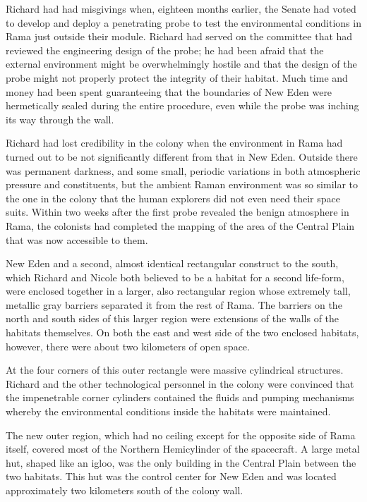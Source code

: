 \documentclass[]{article}
\begin{document}
{Richard had had misgivings when, eighteen months earlier, the Senate had voted to develop and deploy a penetrating probe to test the environmental conditions in Rama just outside their module.  Richard had served on the committee that had reviewed the engineering design of the probe; he had been afraid that the external environment might be overwhelmingly hostile and that the design of the probe might not properly protect the integrity of their habitat.  Much time and money had been spent guaranteeing that the boundaries of New Eden were hermetically sealed during the entire procedure, even while the probe was inching its way through the wall.

Richard had lost credibility in the colony when the environment in Rama had turned out to be not significantly different from that in New Eden.  Outside there was permanent darkness, and some small, periodic variations in both atmospheric pressure and constituents, but the ambient Raman environment was so similar to the one in the colony that the human explorers did not even need their space suits.  Within two weeks after the first probe revealed the benign atmosphere in Rama, the colonists had completed the mapping of the area of the Central Plain that was now accessible to them.

New Eden and a second, almost identical rectangular construct to the south, which Richard and Nicole both believed to be a habitat for a second life-form, were enclosed together in a larger, also rectangular region whose extremely tall, metallic gray barriers separated it from the rest of Rama.  The barriers on the north and south sides of this larger region were extensions of the walls of the habitats themselves.  On both the east and west side of the two enclosed habitats, however, there were about two kilometers of open space.

At the four corners of this outer rectangle were massive cylindrical structures.  Richard and the other technological personnel in the colony were convinced that the impenetrable corner cylinders contained the fluids and pumping mechanisms whereby the environmental conditions inside the habitats were maintained.

The new outer region, which had no ceiling except for the opposite side of Rama itself, covered most of the Northern Hemicylinder of the spacecraft.  A large metal hut, shaped like an igloo, was the only building in the Central Plain between the two habitats.  This hut was the control center for New Eden and was located approximately two kilometers south of the colony wall.

}
\end{document}
